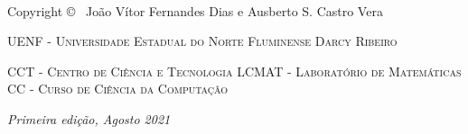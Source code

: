 \newpage
~\vfill
\thispagestyle{empty}

\noindent Copyright \copyright\  \the\year{} João Vítor Fernandes Dias e Ausberto S. Castro Vera %

\noindent \textsc{UENF - Universidade Estadual do Norte Fluminense Darcy Ribeiro} %

\noindent \textsc{CCT - Centro de Ciência e Tecnologia} %
\noindent \textsc{LCMAT - Laboratório de Matemáticas} %
\noindent \textsc{CC - Curso de Ciência da Computação} %


\noindent \textit{Primeira edição, Agosto 2021} %